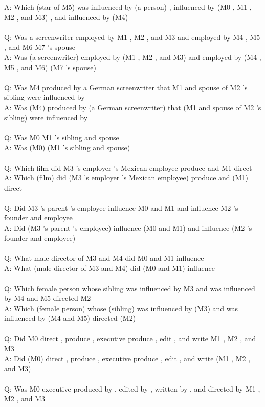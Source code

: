 \documentclass{article} \usepackage{iclr2022_conference,times}
\begin{document}
{A: Which (star of M5) was influenced by (a person) , influenced by (M0 , M1 , M2 , and M3) , and influenced by (M4) \\
 \\
Q: Was a screenwriter employed by M1 , M2 , and M3 and employed by M4 , M5 , and M6 M7 's spouse \\
A: Was (a screenwriter) employed by (M1 , M2 , and M3) and employed by (M4 , M5 , and M6) (M7 's spouse) \\
 \\
Q: Was M4 produced by a German screenwriter that M1 and spouse of M2 's sibling were influenced by \\
A: Was (M4) produced by (a German screenwriter) that (M1 and spouse of M2 's sibling) were influenced by \\
 \\
Q: Was M0 M1 's sibling and spouse \\
A: Was (M0) (M1 's sibling and spouse) \\
 \\
Q: Which film did M3 's employer 's Mexican employee produce and M1 direct \\
A: Which (film) did (M3 's employer 's Mexican employee) produce and (M1) direct \\
 \\
Q: Did M3 's parent 's employee influence M0 and M1 and influence M2 's founder and employee \\
A: Did (M3 's parent 's employee) influence (M0 and M1) and influence (M2 's founder and employee) \\
 \\
Q: What male director of M3 and M4 did M0 and M1 influence \\
A: What (male director of M3 and M4) did (M0 and M1) influence \\
 \\
Q: Which female person whose sibling was influenced by M3 and was influenced by M4 and M5 directed M2 \\
A: Which (female person) whose (sibling) was influenced by (M3) and was influenced by (M4 and M5) directed (M2) \\
 \\
Q: Did M0 direct , produce , executive produce , edit , and write M1 , M2 , and M3 \\
A: Did (M0) direct , produce , executive produce , edit , and write (M1 , M2 , and M3) \\
 \\
Q: Was M0 executive produced by , edited by , written by , and directed by M1 , M2 , and M3 \\
}
\end{document}
